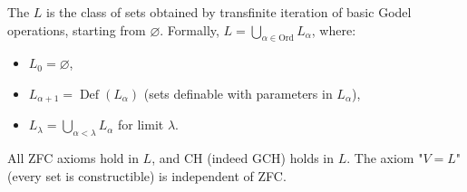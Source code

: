 The  $L$ is the class of sets obtained by transfinite iteration of basic Godel operations, starting from $\varnothing$. Formally, $L = \bigcup_{\alpha \in \mathrm{Ord}} L_\alpha$, where:
\begin{itemize}
\item $L_0 = \varnothing$,
\item $L_{\alpha+1} = \operatorname{Def}(L_\alpha)$ (sets definable with parameters in $L_\alpha$),
\item $L_\lambda = \bigcup_{\alpha < \lambda} L_\alpha$ for limit $\lambda$.
\end{itemize}
All ZFC axioms hold in $L$, and CH (indeed GCH) holds in $L$. The axiom "$V = L$" (every set is constructible) is independent of ZFC.

